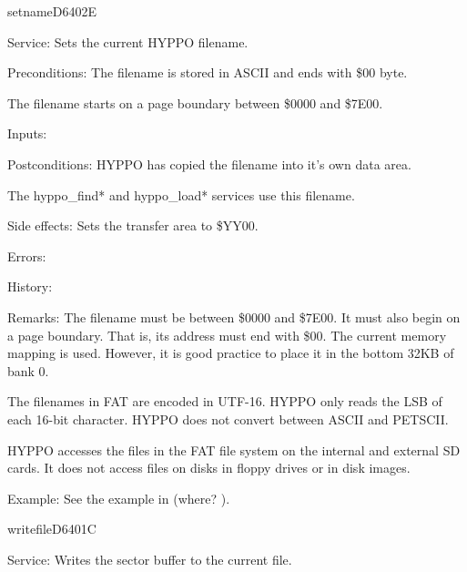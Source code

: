 \newpage
\begin{hyppotrap}{setname}{D640}{2E}
\item [Service:]
  Sets the current HYPPO filename.
\item [Preconditions:]
  The filename is stored in ASCII and ends with \$00 byte.

  The filename starts on a page boundary between \$0000 and \$7E00.
\item [Inputs:]
\item [Postconditions:]
  HYPPO has copied the filename into it's own data area.

  The hyppo\_find* and hyppo\_load* services use this filename.
\item [Side effects:]
  Sets the transfer area to \$YY00.
\item [Errors:]
\item [History:]
\item [Remarks:]
  The filename must be between \$0000 and \$7E00. It must also begin on a
  page boundary. That is, its address must end with \$00. The current memory
  mapping is used. However, it is good practice to place it in the bottom 32KB
  of bank 0.

  The filenames in FAT are encoded in UTF-16. HYPPO only reads the LSB
  of each 16-bit character. HYPPO does not convert between ASCII and
  PETSCII.

  HYPPO accesses the files in the FAT file system on the internal and
  external SD cards. It does not access files on disks in floppy drives or in
  disk images.
\item [Example:]
  See the example in (where? \TODO).
\end{hyppotrap}


\newpage
\begin{hyppotrap}{writefile}{D640}{1C}
\item [Service:]
  Writes the sector buffer to the current file.
\notimplemented
\end{hyppotrap}



